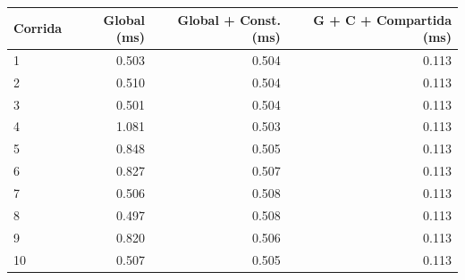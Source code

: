 \begin{tabular}{lrrr}
\toprule
Corrida & Global (ms) & Global + Const. (ms) & G + C + Compartida (ms) \\
\midrule
1 & 0.503 & 0.504 & 0.113 \\
2 & 0.510 & 0.504 & 0.113 \\
3 & 0.501 & 0.504 & 0.113 \\
4 & 1.081 & 0.503 & 0.113 \\
5 & 0.848 & 0.505 & 0.113 \\
6 & 0.827 & 0.507 & 0.113 \\
7 & 0.506 & 0.508 & 0.113 \\
8 & 0.497 & 0.508 & 0.113 \\
9 & 0.820 & 0.506 & 0.113 \\
10 & 0.507 & 0.505 & 0.113 \\
\bottomrule
\end{tabular}
